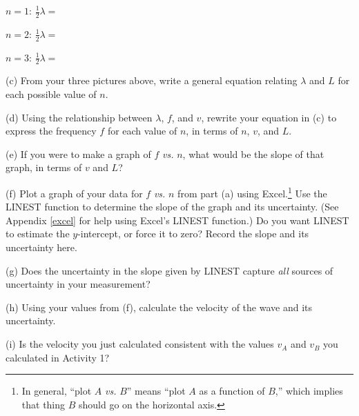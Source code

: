 \begin{center}
$n=1$: 
\raisebox{-0.15in}{\rule{3pt}{0.4in}}\raisebox{.05in}{\rule{2.5in}{0.1pt}}\raisebox{-0.15in}{\rule{3pt}{0.4in}}
\hspace{0.3in}$\frac{1}{2}\lambda=$

$n=2$:
\raisebox{-0.15in}{\rule{3pt}{0.4in}}\raisebox{.05in}{\rule{2.5in}{0.1pt}}\raisebox{-0.15in}{\rule{3pt}{0.4in}}
\hspace{0.3in}$\frac{1}{2}\lambda=$

$n=3$:
\raisebox{-0.15in}{\rule{3pt}{0.4in}}\raisebox{.05in}{\rule{2.5in}{0.1pt}}\raisebox{-0.15in}{\rule{3pt}{0.4in}}
\hspace{0.3in}$\frac{1}{2}\lambda=$
\end{center}

(c) From your three pictures above, write a general equation relating $\lambda$ and $L$ for each possible value of $n$.
\answerspace{2cm}

(d) Using the relationship between $\lambda$, $f$, and $v$, rewrite your equation in (c) to express the frequency $f$ for each value of $n$, in terms of $n$, $v$, and $L$.
\answerspace{2cm}

(e) If you were to make a graph of $f$ \textit{vs.} $n$, what would be the slope of that graph, in terms of $v$ and $L$?
\answerspace{2cm}

\pagebreak[3]
(f) Plot a graph of your data for $f$ \textit{vs.} $n$ from part (a) using Excel.\footnote{In general, ``plot $A$ \textit{vs.} $B$'' means ``plot $A$ as a function of $B$,'' which implies that thing $B$ should go on the horizontal axis.} Use the LINEST function to determine the slope of the graph and its uncertainty. (See Appendix \ref{excel} for help using Excel's LINEST function.)  Do you want LINEST to estimate the $y$-intercept, or force it to zero?  Record the slope and its uncertainty here.
\answerspace{3cm}



(g) Does the uncertainty in the slope given by LINEST capture \textit{all} sources of uncertainty in your measurement?
\answerspace{2cm}

(h) Using your values from (f), calculate the velocity of the wave and its uncertainty. 
\answerspace{4cm}

(i) Is the velocity you just calculated consistent with the values $v_A$ and $v_B$ you calculated in Activity 1?  
\answerspace{3cm}


%





